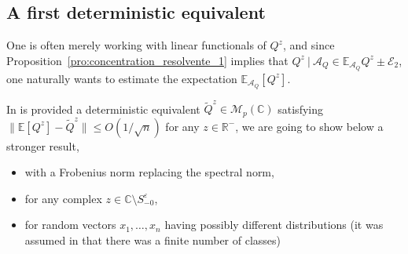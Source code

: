 \documentclass[a4papaer, titlepage]{book}
\begin{document}
\subsection{A first deterministic equivalent}
One is often merely working with linear functionals of $Q^z$, and since Proposition~\ref{pro:concentration_resolvente_1} implies that $Q^z \ | \ \mathcal A_Q \in \mathbb E_{\mathcal A_Q} Q^z \pm \mathcal E_2$, one naturally wants to estimate the expectation $\mathbb E_{\mathcal A_Q} [Q^z]$. 


In \cite{louart2018concentration} is provided a deterministic equivalent $\tilde Q^z \in \mathcal M_p(\mathbb C)$ satisfying $\|\mathbb E[Q^{z}]- \tilde Q^z\| \leq O(1/\sqrt n)$ for any $z \in \mathbb R^-$, we are going to show below a stronger result,
\begin{itemize}
   \item with a Frobenius norm replacing the spectral norm,
   \item for any complex $z \in \mathbb C \setminus S_{-0}^\varepsilon$,
   \item for random vectors $x_1,\ldots, x_n$ having possibly different distributions (it was assumed in \cite{louart2018concentration} that there was a finite number of classes)
 \end{itemize}
\end{document}
